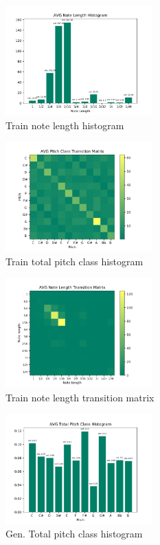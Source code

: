 \documentclass[10pt,twocolumn,letterpaper]{article}
\begin{document}
\begin{figure}[!h]
  \centering
  \includegraphics[width = 160pt]{./images/01-abs-train/6.png}
  \caption{Train note length histogram}
  \label{img:train_notelengthhist}
\end{figure}

\begin{figure}[!h]
  \centering
  \includegraphics[width = 160pt]{./images/01-abs-train/9.png}
  \caption{Train total pitch class histogram}
  \label{img:train_pitchclasstransitionmatrix}
\end{figure}

\begin{figure}[!h]
  \centering
  \includegraphics[width = 160pt]{./images/01-abs-train/7.png}
  \caption{Train note length transition matrix}
  \label{img:train_notelengthtransitionmatrix}
\end{figure}


% 
% 


\begin{figure}[!h]%
  \centering
  \includegraphics[width = 160pt]{./images/02-abs-gen/8.png}
  \caption{Gen. Total pitch class histogram}
  \label{img:total_pitch_class_histogram}
\end{figure}
\end{document}
